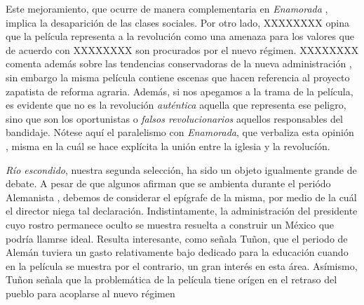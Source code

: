 Este mejoramiento, que ocurre de manera complementaria en \emph{Enamorada} %
, implica la desaparición de las clases sociales. %
Por otro lado, XXXXXXXX opina que la película representa a la revolución como una amenaza %
para los valores que de acuerdo con XXXXXXXX 
son procurados por el nuevo régimen. %
XXXXXXXX comenta además sobre las tendencias conservadoras de la nueva administración %
, sin embargo la misma película contiene escenas que hacen referencia al proyecto zapatista de reforma agraria. %
Además, si nos apegamos a la trama de la película, es evidente que no es la revolución \emph{auténtica} aquella que representa ese peligro, sino que son los oportunistas o \emph{falsos revolucionarios} aquellos responsables del bandidaje. %
Nótese aquí el paralelismo con \emph{Enamorada}, que verbaliza esta opinión %
, misma en la cuál se hace explícita la unión entre la iglesia y la revolucíón.%



\emph{Río escondido}, nuestra segunda selección, ha sido un objeto igualmente grande de debate. 
A pesar de que algunos afirman que se ambienta durante el periódo Alemanista %
, debemos de considerar el epígrafe de la misma, por medio de la cuál el director niega tal declaración.%
Indistintamente, la administración del presidente cuyo rostro permanece oculto%
se muestra resuelta a construir un México que podría llamrse ideal.%
Resulta interesante, como señala Tuñon, que el periodo de Alemán tuviera un gasto relativamente bajo dedicado para la educación %
cuando en la película se muestra por el contrario, un gran interés en esta área. %
Asímismo, Tuñon señala que la problemática de la película tiene orígen en el retraso del pueblo para acoplarse al nuevo régimen%

\pagebreak
